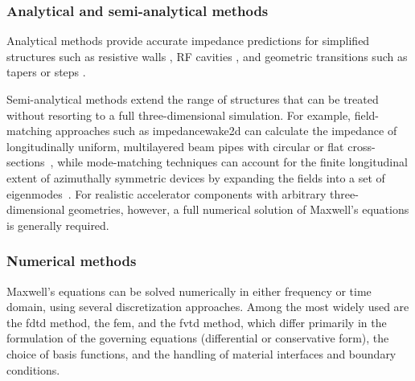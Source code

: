 \subsubsection{Analytical and semi-analytical methods}

Analytical methods provide accurate impedance predictions for simplified structures such as resistive walls
\cite{yokoya_resistive_1993, migliorati_resistive_2019}, RF cavities
\cite{hofmann_analytic_1990, jensen_rf_2014}, and geometric transitions such as tapers or steps
\cite{yokoya_impedance_1990, stupakov_low_2007, palumbo_wake_1995}.

Semi-analytical methods extend the range of structures that can be treated without resorting to a full three-dimensional simulation. For example, field-matching approaches such as \gls{impedancewake2d} can calculate the impedance of longitudinally uniform, multilayered beam pipes with circular or flat cross-sections~\cite{mounetElectromagneticFieldsBeam2010}, while mode-matching techniques can account for the finite longitudinal extent of azimuthally symmetric devices by expanding the fields into a set of eigenmodes~\cite{biancacciModeMatchingTechnique2014}. For realistic accelerator components with arbitrary three-dimensional geometries, however, a full numerical solution of Maxwell's equations \cite{maxwell_viii_1997} is generally required.

\subsubsection{Numerical methods}

Maxwell's equations can be solved numerically in either frequency or time domain, using several discretization approaches. Among the most widely used are the \gls{fdtd} method, the \gls{fem}, and the \gls{fvtd} method, which differ primarily in the formulation of the governing equations (differential or conservative form), the choice of basis functions, and the handling of material interfaces and boundary conditions.

